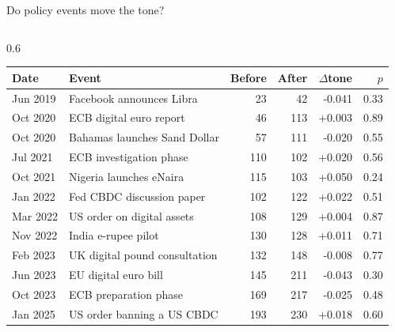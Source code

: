 \documentclass[aspectratio=169,10pt]{beamer}
\begin{document}
\begin{frame}{Do policy events move the tone?}
\begin{columns}[T]
\begin{column}{0.6\textwidth}\scriptsize
\setlength{\tabcolsep}{3pt}
\begin{tabular}{@{}llrrrr@{}}\toprule
\textbf{Date} & \textbf{Event} & \textbf{Before} & \textbf{After} & $\Delta$\textbf{tone} & $p$\\\midrule
Jun 2019 & Facebook announces Libra & 23 & 42 & -0.041 & 0.33 \\
Oct 2020 & ECB digital euro report & 46 & 113 & +0.003 & 0.89 \\
Oct 2020 & Bahamas launches Sand Dollar & 57 & 111 & -0.020 & 0.55 \\
Jul 2021 & ECB investigation phase & 110 & 102 & +0.020 & 0.56 \\
Oct 2021 & Nigeria launches eNaira & 115 & 103 & +0.050 & 0.24 \\
Jan 2022 & Fed CBDC discussion paper & 102 & 122 & +0.022 & 0.51 \\
Mar 2022 & US order on digital assets & 108 & 129 & +0.004 & 0.87 \\
Nov 2022 & India e-rupee pilot & 130 & 128 & +0.011 & 0.71 \\
Feb 2023 & UK digital pound consultation & 132 & 148 & -0.008 & 0.77 \\
Jun 2023 & EU digital euro bill & 145 & 211 & -0.043 & 0.30 \\
Oct 2023 & ECB preparation phase & 169 & 217 & -0.025 & 0.48 \\
Jan 2025 & US order banning a US CBDC & 193 & 230 & +0.018 & 0.60 \\
\bottomrule\end{tabular}

\end{column}
\end{columns}
\end{frame}
\end{document}
